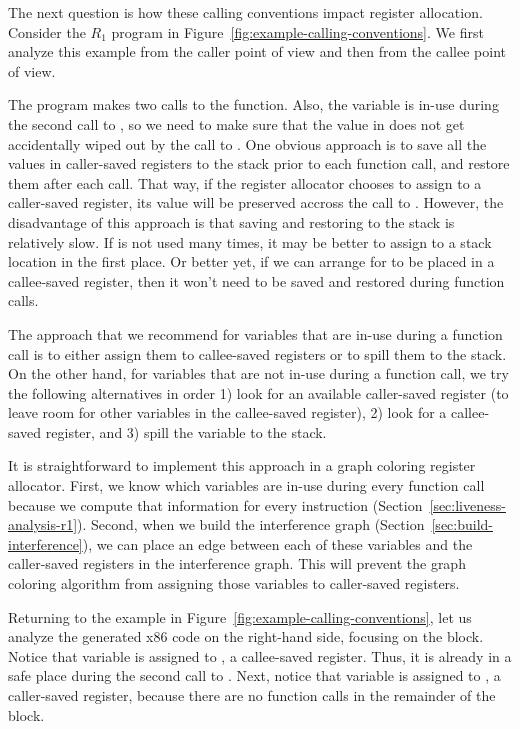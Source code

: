 \documentclass[11pt]{book}
\begin{document}
The next question is how these calling conventions impact register
allocation. Consider the $R_1$ program in
Figure~\ref{fig:example-calling-conventions}.  We first analyze this
example from the caller point of view and then from the callee point
of view.

The program makes two calls to the  function.  Also, the
variable  is in-use during the second call to , so
we need to make sure that the value in  does not get
accidentally wiped out by the call to .  One obvious
approach is to save all the values in caller-saved registers to the
stack prior to each function call, and restore them after each
call. That way, if the register allocator chooses to assign 
to a caller-saved register, its value will be preserved accross the
call to .  However, the disadvantage of this approach is
that saving and restoring to the stack is relatively slow. If 
is not used many times, it may be better to assign  to a stack
location in the first place. Or better yet, if we can arrange for
 to be placed in a callee-saved register, then it won't need
to be saved and restored during function calls.

The approach that we recommend for variables that are in-use during a
function call is to either assign them to callee-saved registers or to
spill them to the stack. On the other hand, for variables that are not
in-use during a function call, we try the following alternatives in
order 1) look for an available caller-saved register (to leave room
for other variables in the callee-saved register), 2) look for a
callee-saved register, and 3) spill the variable to the stack.

It is straightforward to implement this approach in a graph coloring
register allocator. First, we know which variables are in-use during
every function call because we compute that information for every
instruction (Section~\ref{sec:liveness-analysis-r1}). Second, when we
build the interference graph (Section~\ref{sec:build-interference}),
we can place an edge between each of these variables and the
caller-saved registers in the interference graph. This will prevent
the graph coloring algorithm from assigning those variables to
caller-saved registers.

Returning to the example in
Figure~\ref{fig:example-calling-conventions}, let us analyze the
generated x86 code on the right-hand side, focusing on the
 block. Notice that variable  is assigned to
, a callee-saved register. Thus, it is already in a safe
place during the second call to . Next, notice that
variable  is assigned to , a caller-saved register,
because there are no function calls in the remainder of the block.
\end{document}
